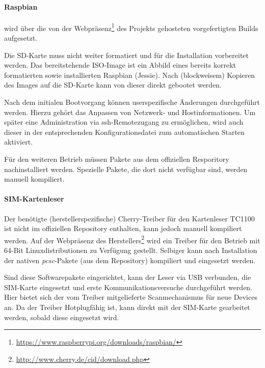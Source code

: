 			\paragraph{Raspbian} wird über die von der Webpräsenz\footnote{\url{https://www.raspberrypi.org/downloads/raspbian/}}
            des Projekts gehosteten vorgefertigten Builds aufgesetzt.

            Die SD-Karte muss nicht weiter formatiert und für die Installation vorbereitet werden. Das
            bereitstehende ISO-Image ist ein Abbild eines bereits korrekt formatierten sowie installierten
            Raspbian (Jessie). Nach (blockweisem) Kopieren des Images auf die SD-Karte kann von dieser direkt
            gebootet werden.

            Nach dem initialen Bootvorgang können userspezifische Änderungen durchgeführt werden. Hierzu
            gehört das Anpassen von Netzwerk- und Hostinformationen. Um später eine Administration via
            \ac{ssh}-Remotezugang zu ermöglichen, wird auch dieser in der entsprechenden Konfigurationsdatei
            zum automatischen Starten aktiviert.

            Für den weiteren Betrieb müssen Pakete aus dem offiziellen Resporitory
            nachinstalliert werden. Spezielle Pakete, die dort nicht verfügbar sind, werden
            manuell kompiliert.

            \paragraph{SIM-Kartenleser} Der benötigte (herstellerspezifische)
            Cherry-Treiber für den Kartenleser TC1100 ist nicht im offiziellen Repository enthalten, kann jedoch
            manuell kompiliert werden. Auf der Webpräsenz des Herstellers\footnote{\url{http://www.cherry.de/cid/download.php}}
            wird ein Treiber für den Betrieb mit 64-Bit Linuxdistributionen zu Verfügung gestellt.
            Selbiger kann nach Installation der nativen \textit{pcsc}-Pakete (aus dem Repository)
            kompiliert und eingesetzt werden.

            Sind diese Softwarepakete eingerichtet, kann der Leser via USB verbunden, die SIM-Karte eingesetzt
            und erste Kommunikationsversuche durchgeführt werden. Hier bietet sich der vom
            Treiber mitgelieferte Scanmechanismus für neue Devices an. Da der Treiber
            Hotplugfähig ist, kann direkt mit der SIM-Karte gearbeitet werden, sobald diese
            eingesetzt wird.
    \clearpage
